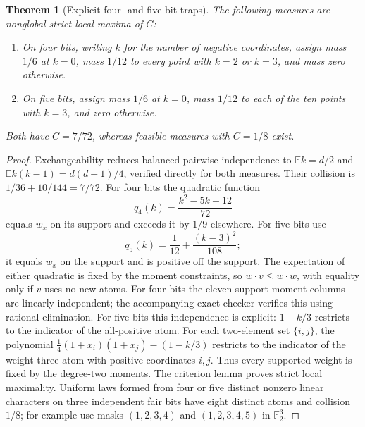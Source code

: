 \documentclass[11pt]{article}
\newtheorem{theorem}{Theorem}[section]
\begin{document}
\begin{theorem}[Explicit four- and five-bit traps]
\label{thm:attainment-small-traps}
The following measures are nonglobal strict local maxima of $C$:
\begin{enumerate}
\item On four bits, writing $k$ for the number of negative coordinates,
assign mass $1/6$ at $k=0$, mass $1/12$ to every point with $k=2$ or
$k=3$, and mass zero otherwise.
\item On five bits, assign mass $1/6$ at $k=0$, mass $1/12$ to each
of the ten points with $k=3$, and zero otherwise.
\end{enumerate}
Both have $C=7/72$, whereas feasible measures with $C=1/8$ exist.
\end{theorem}
\begin{proof}
Exchangeability reduces balanced pairwise independence to
$\mathbb E k=d/2$ and $\mathbb E k(k-1)=d(d-1)/4$, verified directly
for both measures. Their collision is $1/36+10/144=7/72$.
For four bits the quadratic function
\[
 q_4(k)=\frac{k^2-5k+12}{72}
\]
equals $w_x$ on its support and exceeds it by $1/9$ elsewhere.
For five bits use
\[
 q_5(k)=\frac1{12}+\frac{(k-3)^2}{108};
\]
it equals $w_x$ on the support and is positive off the support.
The expectation of either quadratic is fixed by the moment constraints,
so $w\cdot v\le w\cdot w$, with equality only if $v$ uses no new atoms.
For four bits the eleven support moment columns are linearly independent;
the accompanying exact checker verifies this using rational elimination.
For five bits this independence is explicit: $1-k/3$ restricts to the
indicator of the all-positive atom. For each two-element set $\{i,j\}$,
the polynomial $\frac14(1+x_i)(1+x_j)-(1-k/3)$ restricts to the
indicator of the weight-three atom with positive coordinates $i,j$.
Thus every supported weight is fixed by the degree-two moments.
The criterion lemma proves strict local maximality. Uniform laws formed
from four or five distinct nonzero linear characters on three independent
fair bits have eight distinct atoms and collision $1/8$; for example
use masks $(1,2,3,4)$ and $(1,2,3,4,5)$ in $\mathbb F_2^3$.
\end{proof}
\end{document}
